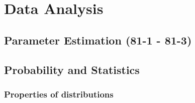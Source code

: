 \documentclass{mitqualif}
\begin{document}
\section{Data Analysis}
\subsection{Parameter Estimation (81-1 - 81-3)}
\subsection{Probability and Statistics}
\subsubsection{Properties of distributions}
 


\newpage

\newpage
\printindex
\newpage

\end{document}
